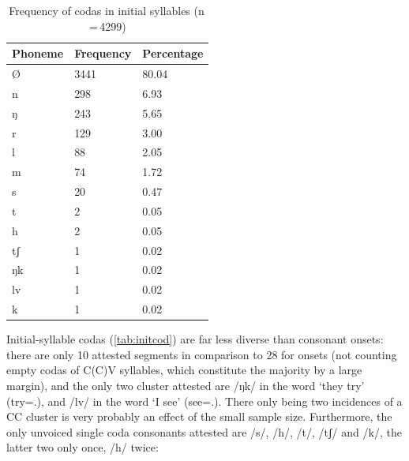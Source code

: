 \begin{table}[pth]\centering
\caption[Frequency of codas in initial syllables]{Frequency of codas in initial 
syllables (n\,=\,4299)}
\begin{tabu} to 0.5\linewidth{X X[c] X[c]}
\tableheaderfont\toprule
Phoneme
	& Frequency
	& Percentage
	\\
	
\toprule

Ø
	& 3441
	& 80.04\pct
	\\

\midrule

n
	& 298
	& 6.93\pct
	\\

ŋ
	& 243
	& 5.65\pct
	\\

r
	& 129
	& 3.00\pct
	\\

l
	& 88
	& 2.05\pct
	\\

m
	& 74
	& 1.72\pct
	\\

s
	& 20
	& 0.47\pct
	\\

t
	& 2
	& 0.05\pct
	\\

h
	& 2
	& 0.05\pct
	\\
	
tʃ
	& 1
	& 0.02\pct
	\\

ŋk
	& 1
	& 0.02\pct
	\\

lv
	& 1
	& 0.02\pct
	\\

k
	& 1
	& 0.02\pct
	\\

\bottomrule
\end{tabu}
\label{tab:initcod}
\end{table}

Initial-syllable codas (\autoref{tab:initcod}) are far less diverse than 
consonant onsets: there are only 10 attested segments in comparison to 28 for 
onsets (not counting empty codas of C(C)V syllables, which constitute the 
majority by a large margin), and the only two cluster attested are /ŋk/ in the 
word  `they try' (try=\TplM{}.\Aarg{}), and /lv/ in the 
word  `I see' (see=\Fpl{}.\Aarg{}). There only being 
two incidences of a CC cluster is very probably an effect of the small 
sample size. Furthermore, the only unvoiced single coda consonants attested are 
/s/, /h/, /t/, /tʃ/ and /k/, the latter two only once, /h/ twice:


